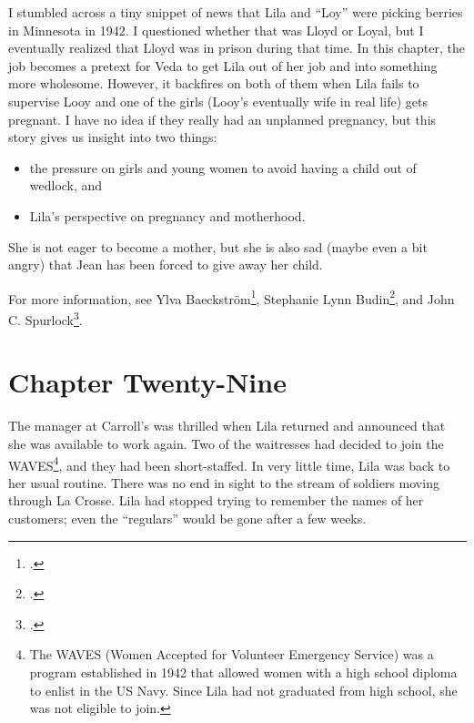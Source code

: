 \documentclass[
  letterpaper,
]{book}
\providecommand{\tightlist}{%
  \setlength{\itemsep}{0pt}\setlength{\parskip}{0pt}}\usepackage{longtable,booktabs,array}
\begin{document}
I stumbled across a tiny snippet of news that Lila and ``Loy'' were
picking berries in Minnesota in 1942. I questioned whether that was
Lloyd or Loyal, but I eventually realized that Lloyd was in prison
during that time. In this chapter, the job becomes a pretext for Veda to
get Lila out of her job and into something more wholesome. However, it
backfires on both of them when Lila fails to supervise Looy and one of
the girls (Looy's eventually wife in real life) gets pregnant. I have no
idea if they really had an unplanned pregnancy, but this story gives us
insight into two things:

\begin{itemize}
\tightlist
\item
  the pressure on girls and young women to avoid having a child out of
  wedlock, and
\item
  Lila's perspective on pregnancy and motherhood.
\end{itemize}

She is not eager to become a mother, but she is also sad (maybe even a
bit angry) that Jean has been forced to give away her child.

For more information, see Ylva Baeckström\footnote{.}, Stephanie Lynn Budin\footnote{.}, and John C. Spurlock\footnote{.}.


\chapter{Chapter Twenty-Nine}\label{chapter-twenty-nine}

The manager at Carroll's was thrilled when Lila returned and announced
that she was available to work again. Two of the waitresses had decided
to join the WAVES\footnote{The WAVES (Women Accepted for Volunteer
  Emergency Service) was a program established in 1942 that allowed
  women with a high school diploma to enlist in the US Navy. Since Lila
  had not graduated from high school, she was not eligible to join.},
and they had been short-staffed. In very little time, Lila was back to
her usual routine. There was no end in sight to the stream of soldiers
moving through La Crosse. Lila had stopped trying to remember the names
of her customers; even the ``regulars'' would be gone after a few weeks.
\end{document}
